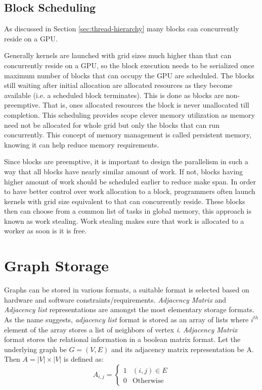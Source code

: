 \subsection{Block Scheduling}\label{sec:block-scheduling}
As discussed in Section \ref{sec:thread-hierarchy} many blocks can concurrently reside on a GPU.

Generally kernels are launched with grid sizes much higher than that can concurrently reside on a GPU, so the block execution needs to be serialized once maximum number of blocks that can occupy the GPU are scheduled. The blocks still waiting after initial allocation are allocated resources as they become available (i.e. a scheduled block terminates).
This is done as blocks are non-preemptive. That is, ones allocated resources the block is never unallocated till completion.
This scheduling provides scope clever memory utilization as memory need not be allocated for whole grid but only the blocks that can run concurrently. This concept of memory management is called persistent memory, knowing it can help reduce memory requirements.

Since blocks are preemptive, it is important to design the parallelism in such a way that all blocks have nearly similar amount of work.
If not, blocks having higher amount of work should be scheduled earlier to reduce make span.
In order to have better control over work allocation to a block, programmers often launch kernels with grid size equivalent to that can concurrently reside.
These blocks then can choose from a common list of tasks in global memory, this approach is known as work stealing.
Work stealing makes sure that work is allocated to a worker as soon is it is free.



\section{Graph Storage}\label{storage-format}
Graphs can be stored in various formats, a suitable format is selected based on hardware and software constraints/requirements.
\textit{Adjacency Matrix} and \textit{Adjacency list} representations are amongst the most elementary storage formats.
As the name suggests, \textit{adjacency list} format is stored as an array of lists where $i^{th}$ element of the array stores a list of neighbors of vertex \textit{i}.
\textit{Adjacency Matrix} format stores the relational information in a boolean matrix format.
Let the underlying graph be $G=(V,E)$ and its adjacency matrix representation be A.
Then $A = |V|\times|V|$ is defined as:
$$
    A_{i,j}=\begin{cases}
        1 & (i,j) \in E      \\
        0 & \text{Otherwise}
    \end{cases}
$$

